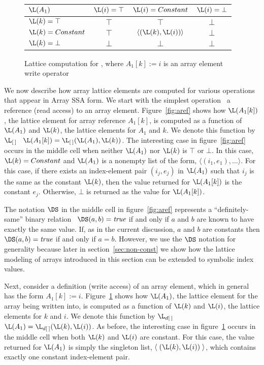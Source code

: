 \begin{figure}%
\begin{center}
\begin{tabular}{|l||c|c|c|}
\hline
$\L(A_1)$ & $\L(i) = \top$ & $\L(i) = Constant$ & $\L(i) = \bot$ \\
\hline \hline
$\L(k) = \top$ & $\top$ & $\top$ & $\bot$ \\
\hline
$\L(k) = Constant$ & $\top$ & $\langle(\L(k),\L(i))\rangle$ & $\bot$ \\
\hline
$\L(k) = \bot$ & $\bot$ & $\bot$ & $\bot$ \\
\hline
\end{tabular}
\end{center}
\caption{Lattice computation for ,
where $A_1[k] := i$ is an 
array element write operator}
\label{fig:adef}
\end{figure}

We now describe how array lattice elements are computed for various
operations that appear in Array SSA form.  We start with the simplest operation
\viz\ a reference (read access) to an array element.
Figure~\ref{fig:aref} shows how $\L(A_1[k])$, the lattice element for array
reference $A_1[k]$, is computed as a function of $\L(A_1)$ and $\L(k)$, 
the lattice elements for $A_1$ and $k$.
We denote this function
by $\L_{[\:]}$ \ie\ $\L(A_1[k]) = \L_{[\:]}(\L(A_1),\L(k))$.  
The interesting case in figure~\ref{fig:aref} occurs
in the middle cell
when neither $\L(A_1)$ nor $\L(k)$ is $\top$ or $\bot$.
In this case, $\L(k) = Constant$ and $\L(A_1)$ is a nonempty list of the form,
$\langle (i_1,e_1), \ldots \rangle$.  For this case, if there exists
an index-element
pair $(i_j, e_j)$ in $\L(A_1)$ such that $i_j$ is the same as the constant
$\L(k)$, then the value returned for $\L(A_1[k])$ is the constant $e_j$.
Otherwise, $\bot$ is returned as the value for $\L(A_1[k])$.

The notation $\DS$ in the middle cell in figure~\ref{fig:aref}
represents a ``definitely-same'' binary relation \ie\ $\DS(a,b) =
\mbox{\it true}$ if and only if $a$ and $b$ are known to have exactly
the same value.  If, as in the current discussion, $a$ and $b$ are
constants then $\DS(a,b) = \mbox{\it true}$ if and only if $a=b$.
However, we use the $\DS$ notation for generality because later in
section~\ref{sec:non-const} we show how the lattice modeling of arrays
introduced in this section can be extended to symbolic index values.

Next, consider a definition (write access) of an array element, which 
in general has the form $A_1[k] := i$.
Figure~\ref{fig:adef} shows how $\L(A_1)$, the lattice element for 
the array being written into,
is computed as a function of $\L(k)$ and $\L(i)$, 
the lattice elements for $k$ and $i$.  We denote this function
by $\L_{d[\:]}$ \ie\ $\L(A_1) = \L_{d[\:]}(\L(k),\L(i))$.  
As before,
the interesting case in figure~\ref{fig:adef} occurs
in the middle cell
when both $\L(k)$ and $\L(i)$ are constant.
For this case, the value returned for $\L(A_1)$ is simply 
the singleton list,
$\langle\;(\L(k),\L(i))\;\rangle$, which contains exactly
one constant index-element pair.


